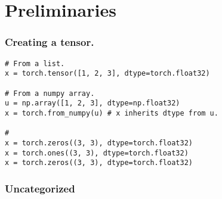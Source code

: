 \section{Preliminaries}

\subsubsection*{Creating a tensor.}

\begin{mdframed}[backgroundcolor=gray!10,linecolor=Firebrick4]
\begin{verbatim}
# From a list.
x = torch.tensor([1, 2, 3], dtype=torch.float32)

# From a numpy array.
u = np.array([1, 2, 3], dtype=np.float32)
x = torch.from_numpy(u) # x inherits dtype from u.

# 
x = torch.zeros((3, 3), dtype=torch.float32)
x = torch.ones((3, 3), dtype=torch.float32)
x = torch.zeros((3, 3), dtype=torch.float32)

\end{verbatim}
\end{mdframed}

\subsubsection*{Uncategorized}

\begin{tabularx}{\linewidth}{lX}
    
\end{tabularx}